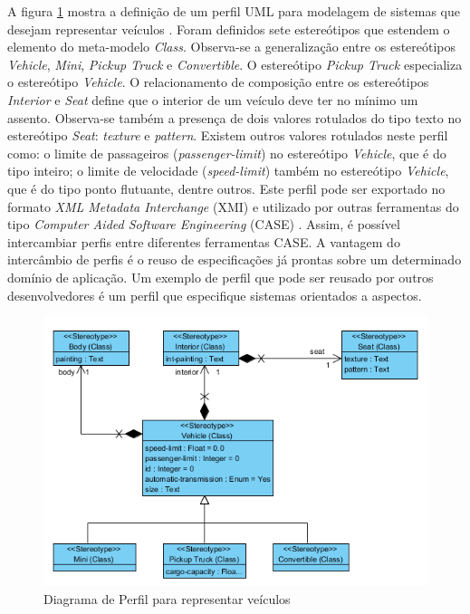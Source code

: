 A figura \ref{fig:profile_diagram} mostra a definição de um perfil UML para modelagem de sistemas que desejam representar veículos
\cite{VisualParadigm11}. Foram definidos sete estereótipos que estendem o elemento do meta-modelo \textit{Class}. Observa-se a generalização entre os
estereótipos \textit{Vehicle}, \textit{Mini}, \textit{Pickup Truck} e \textit{Convertible}. O estereótipo \textit{Pickup Truck} especializa o
estereótipo \textit{Vehicle}. O relacionamento de composição entre os estereótipos \textit{Interior} e \textit{Seat} define que o interior de um
veículo deve ter no mínimo um assento. Observa-se também a presença de dois valores rotulados do tipo texto no estereótipo \textit{Seat}:
\textit{texture} e \textit{pattern}. Existem outros valores rotulados neste perfil como: o limite de passageiros (\textit{passenger-limit}) no
estereótipo \textit{Vehicle}, que é do tipo inteiro; o limite de velocidade (\textit{speed-limit}) também no estereótipo \textit{Vehicle}, que é do
tipo ponto flutuante, dentre outros. Este perfil pode ser exportado no formato \textit{XML Metadata Interchange} (XMI)  \cite{xmi:11} 
e utilizado por outras ferramentas do tipo \textit{Computer Aided Software Engineering} (CASE) . Assim, 
é possível intercambiar perfis entre diferentes ferramentas CASE. A vantagem do intercâmbio de perfis é o reuso de
especificações já prontas sobre um determinado domínio de aplicação. Um exemplo de perfil que pode ser reusado por outros desenvolvedores é um perfil
que especifique sistemas orientados a aspectos.

\begin{figure}
	\centering
	\includegraphics{img/profile_diagram.png}
	\caption{Diagrama de Perfil para representar veículos}\label{fig:profile_diagram}
\end{figure}

